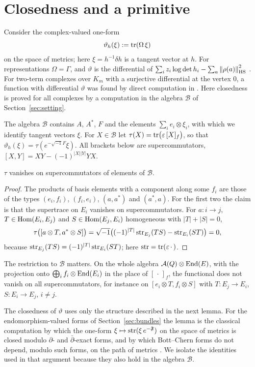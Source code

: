 \section{Closedness and a primitive}\label{sec:primitive}

Consider the complex-valued one-form
\[
 \vartheta_h(\xi):=\operatorname{tr}(\Omega\,\xi)
\]
on the space of metrics; here $\xi=h^{-1}\delta h$ is a tangent vector at
$h$. For representations $\Omega=\Gamma$, and
$\vartheta$ is the differential of
$\sum_iz_i\log\det h_i-\sum_a\left\lVert\rho(a)\right\rVert_{\mathrm{HS}}^2$ \cite[\S5.1]{hkkp26}. For
two-term complexes over $K_m$ with a surjective differential at the vertex
$0$, a function with differential $\vartheta$ was found by direct computation
in \cite[Proposition~7.1]{wue26a}. Here closedness is proved for all
complexes by a computation in the algebra $\mathcal B$ of
Section~\ref{sec:setting}.

The algebra $\mathcal B$ contains $A$, $A^*$, $F$ and the elements
$\sum_ie_i\otimes\xi_i$, with which we identify tangent vectors $\xi$. For
$X\in\mathcal B$ let $\tau(X)=\operatorname{tr}\bigl(\varepsilon\,[X]_f\bigr)$, so that
$\vartheta_h(\xi)=\tau(e^{-\sqrt{-1}F}\xi)$. All brackets below are
supercommutators, $[X,Y]=XY-(-1)^{|X||Y|}YX$.

\begin{lemma}\label{lem:tau}
$\tau$ vanishes on supercommutators of elements of $\mathcal B$.
\end{lemma}

\begin{proof}
The products of basis elements with a component along some $f_i$ are those of
the types $(e_i,f_i)$, $(f_i,e_i)$, $(a,a^*)$ and $(a^*,a)$. For the first
two the claim is that the supertrace on $E_i$ vanishes on supercommutators.
For $a:i\to j$, $T\in\operatorname{Hom}(E_i,E_j)$ and
$S\in\operatorname{Hom}(E_j,E_i)$ homogeneous with $|T|+|S|=0$,
\[
 \tau\bigl([a\otimes T,a^*\otimes S]\bigr)
 =\sqrt{-1}\bigl((-1)^{|T|}\operatorname{str}_{E_j}(TS)-\operatorname{str}_{E_i}(ST)\bigr)=0,
\]
because $\operatorname{str}_{E_j}(TS)=(-1)^{|T|}\operatorname{str}_{E_i}(ST)$; here $\operatorname{str}=\operatorname{tr}(\varepsilon\,\cdot\,)$.
\end{proof}

The restriction to $\mathcal B$ matters. On the whole algebra
$\mathcal A(Q)\otimes\operatorname{End}(E)$, with the projection onto
$\bigoplus_if_i\otimes\operatorname{End}(E_i)$ in the place of $[\,\cdot\,]_f$, the functional
does not vanish on all supercommutators, for instance on
$[e_i\otimes T,f_i\otimes S]$ with $T:E_j\to E_i$, $S:E_i\to E_j$, $i\neq j$.

The closedness of $\vartheta$ uses only the structure described in the next
lemma. For the endomorphism-valued forms of Section~\ref{sec:bundles} the
lemma is the classical computation by which the one-form
$\xi\mapsto\operatorname{str}(\xi\,e^{-\mathfrak F})$ on the space of metrics is closed
modulo $\partial$- and $\bar\partial$-exact forms, and by which Bott--Chern
forms do not depend, modulo such forms, on the path of metrics
\cite{bc65,don85,bgs88}. We
isolate the identities used in that argument because they also hold in the
algebra $\mathcal B$.

